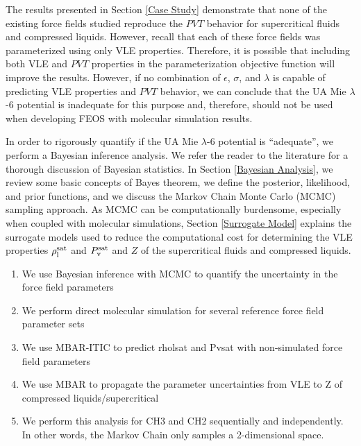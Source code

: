 \documentclass[journal=jctc,manuscript=article]{achemso}
\begin{document}
The results presented in Section \ref{Case Study} demonstrate that none of the existing force fields studied reproduce the $PVT$ behavior for supercritical fluids and compressed liquids. However, recall that each of these force fields was parameterized using only VLE properties. Therefore, it is possible that including both VLE and $PVT$ properties in the parameterization objective function will improve the results. However, if no combination of $\epsilon$, $\sigma$, and $\lambda$ is capable of predicting VLE properties and $PVT$ behavior, we can conclude that the UA Mie $\lambda$-6 potential is inadequate for this purpose and, therefore, should not be used when developing FEOS with molecular simulation results.

In order to rigorously quantify if the UA Mie $\lambda$-6 potential is ``adequate'', we perform a Bayesian inference analysis. We refer the reader to the literature for a thorough discussion of Bayesian statistics. In Section \ref{Bayesian Analysis}, we review some basic concepts of Bayes theorem, we define the posterior, likelihood, and prior functions, and we discuss the Markov Chain Monte Carlo (MCMC) sampling approach. As MCMC can be computationally burdensome, especially when coupled with molecular simulations, Section \ref{Surrogate Model} explains the surrogate models used to reduce the computational cost for determining the VLE properties $\rho_{\rm l}^{\rm sat}$ and $P_{\rm v}^{\rm sat}$ and $Z$ of the supercritical fluids and compressed liquids. 

\begin{enumerate}
	\item We use Bayesian inference with MCMC to quantify the uncertainty in the force field parameters
	\item We perform direct molecular simulation for several reference force field parameter sets
	\item We use MBAR-ITIC to predict rholsat and Pvsat with non-simulated force field parameters
	\item We use MBAR to propagate the parameter uncertainties from VLE to Z of compressed liquids/supercritical
	\item We perform this analysis for CH3 and CH2 sequentially and independently. 
In other words, the Markov Chain only samples a 2-dimensional space. %
\end{enumerate}
\end{document}
